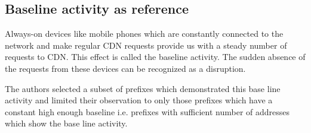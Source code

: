 \documentclass[11pt,twoside,a4paper]{article}
\begin{document}
\subsection{Baseline activity as reference}
Always-on devices like mobile phones which are constantly connected to the network and make regular CDN requests provide us with a steady number of requests to CDN. This effect is called the baseline activity. The sudden absence of the requests from these devices can be recognized as a disruption. 

The authors selected a subset of prefixes which demonstrated this base line activity and limited their observation to only those prefixes which have a constant high enough baseline i.e. prefixes with sufficient number of addresses which show the base line activity. 
\end{document}
